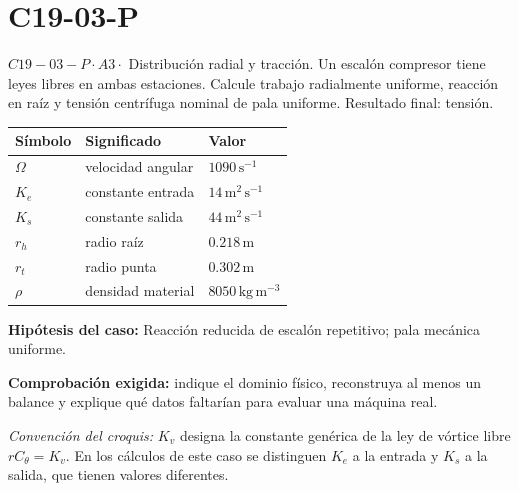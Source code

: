 \documentclass[10pt,openany]{book}
\begin{document}
\section{C19-03-P}
\(C19-03-P \cdot A3 \cdot\) Distribución radial y tracción. Un escalón compresor tiene leyes libres en ambas estaciones. Calcule trabajo radialmente uniforme, reacción en raíz y tensión centrífuga nominal de pala uniforme. Resultado final: tensión.
\begin{center}\begin{tabular}{p{.15\linewidth}p{.42\linewidth}p{.31\linewidth}}\textbf{Símbolo} & \textbf{Significado} & \textbf{Valor}\\\hline
\(\Omega\) & velocidad angular & \(1090\,\mathrm{s}^{-1}\)\\
\(K_e\) & constante entrada & \(14\,\mathrm{m}^{2}\,\mathrm{s}^{-1}\)\\
\(K_s\) & constante salida & \(44\,\mathrm{m}^{2}\,\mathrm{s}^{-1}\)\\
\(r_h\) & radio raíz & \(0.218\,\mathrm{m}\)\\
\(r_t\) & radio punta & \(0.302\,\mathrm{m}\)\\
\(\rho\) & densidad material & \(8050\,\mathrm{kg}\,\mathrm{m}^{-3}\)\\
\end{tabular}\end{center}
\noindent\textbf{Hipótesis del caso:} Reacción reducida de escalón repetitivo; pala mecánica uniforme.\par
\noindent\textbf{Comprobación exigida:} indique el dominio físico, reconstruya al menos un balance y explique qué datos faltarían para evaluar una máquina real.\par
\noindent\emph{Convención del croquis:} $K_v$ designa la constante genérica de la ley de vórtice libre $r C_\theta=K_v$. En los cálculos de este caso se distinguen $K_e$ a la entrada y $K_s$ a la salida, que tienen valores diferentes.\par
\begin{center}\end{center}
\end{document}
